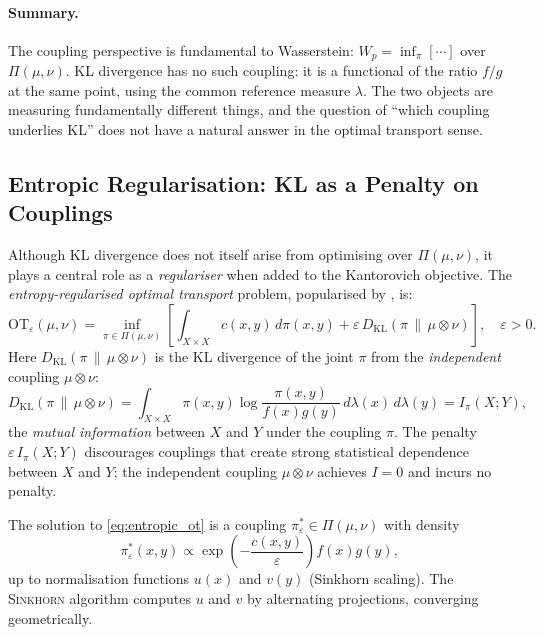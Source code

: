 \documentclass[12pt]{article}
\newcommand{\KL}[2]{D_{\mathrm{KL}}\!\left(#1\,\|\,#2\right)}
\begin{document}
\paragraph{Summary.}
The coupling perspective is fundamental to Wasserstein:
$W_p = \inf_\pi [\cdots]$ over $\Pi(\mu,\nu)$.  KL divergence
has no such coupling: it is a functional of the ratio $f/g$ at
the same point, using the common reference measure $\lambda$.
The two objects are measuring fundamentally different things, and
the question of ``which coupling underlies KL'' does not have
a natural answer in the optimal transport sense.

\subsection{Entropic Regularisation: KL as a Penalty on Couplings}
\label{sec:entropic_ot}

Although KL divergence does not itself arise from optimising
over $\Pi(\mu,\nu)$, it plays a central role as a
\emph{regulariser} when added to the Kantorovich objective.
The \emph{entropy-regularised optimal transport} problem,
popularised by \citet{Cuturi2013}, is:
\begin{equation}\label{eq:entropic_ot}
  \boxed{\mathrm{OT}_\varepsilon(\mu,\nu)
  = \inf_{\pi \in \Pi(\mu,\nu)}
  \left[\int_{X\times X} c(x,y)\,d\pi(x,y)
  + \varepsilon\,\KL{\pi}{\mu\otimes\nu}\right],
  \quad \varepsilon > 0.}
\end{equation}
Here $\KL{\pi}{\mu\otimes\nu}$ is the KL divergence of the
joint $\pi$ from the \emph{independent} coupling $\mu\otimes\nu$:
\begin{equation}\label{eq:kl_joint}
  \KL{\pi}{\mu\otimes\nu}
  = \int_{X\times X} \pi(x,y)\log
    \frac{\pi(x,y)}{f(x)g(y)}\,d\lambda(x)\,d\lambda(y)
  = I_\pi(X;Y),
\end{equation}
the \emph{mutual information} between $X$ and $Y$ under the
coupling $\pi$.  The penalty $\varepsilon\, I_\pi(X;Y)$
discourages couplings that create strong statistical dependence
between $X$ and $Y$; the independent coupling $\mu\otimes\nu$
achieves $I = 0$ and incurs no penalty.

The solution to \eqref{eq:entropic_ot} is a coupling
$\pi_\varepsilon^* \in \Pi(\mu,\nu)$ with density
\begin{equation}\label{eq:sinkhorn_kernel}
  \pi_\varepsilon^*(x,y) \propto
  \exp\!\left(-\frac{c(x,y)}{\varepsilon}\right) f(x)g(y),
\end{equation}
up to normalisation functions $u(x)$ and $v(y)$ (Sinkhorn
scaling).  The \textsc{Sinkhorn} algorithm
\citep{Cuturi2013} computes $u$ and $v$ by alternating
projections, converging geometrically.
\end{document}
